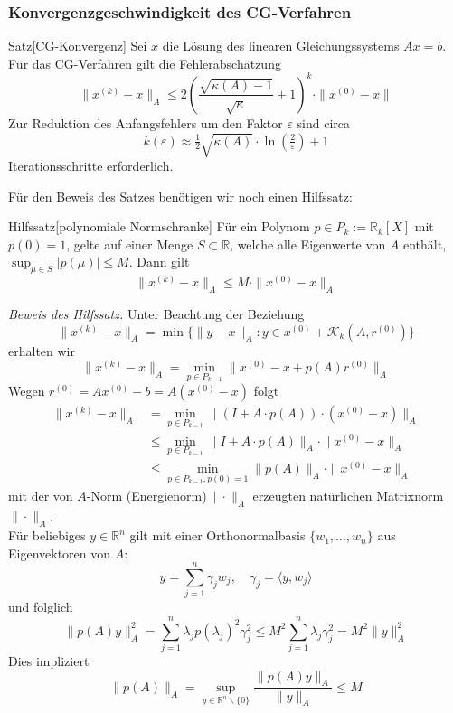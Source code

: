 \documentclass{article}
\begin{document}
    \subsubsection{Konvergenzgeschwindigkeit des CG-Verfahren}
    \begin{thmbox}{Satz}[CG-Konvergenz]
        Sei $x$ die Lösung des linearen Gleichungssystems $Ax=b$. Für das CG-Verfahren gilt die Fehlerabschätzung
        \[\|x^{(k)} - x\|_A \leq 2\left(\dfrac{\sqrt{\kappa(A)-1}}{\sqrt{\kappa}}+1\right)^k \cdot \|x^{(0)}-x\|\]
        Zur Reduktion des Anfangsfehlers um den Faktor $\varepsilon$ sind circa 
        \[k(\varepsilon)\approx \tfrac{1}{2}\sqrt{\kappa(A)}\cdot \ln(\tfrac{2}{\varepsilon}) +1 \]
        Iterationsschritte erforderlich. 
    \end{thmbox}
    Für den Beweis des Satzes benötigen wir noch einen Hilfssatz:
    \begin{thmbox}{Hilfssatz}[polynomiale Normschranke]
        Für ein Polynom $p\in P_k:=\mathbb{R}_k[X]$ mit $p(0)=1$, gelte auf einer Menge $S\subset \mathbb{R}$, welche
        alle Eigenwerte von $A$ enthält, $\sup_{\mu\in S} |p(\mu)| \leq M$. Dann gilt 
        \[\|x^{(k)} - x\|_A \leq M\cdot\|x^{(0)}-x\|_A\]
    \end{thmbox}
    \textit{Beweis des Hilfssatz.} Unter Beachtung der Beziehung 
    \[\|x^{(k)}-x\|_A = \min\{\|y-x\|_A : y\in x^{(0)}+\mathcal{K}_k(A,r^{(0)})\}\]
    erhalten wir 
    \[\|x^{(k)}-x\|_A = \min_{p\in P_{k-1}}\|x^{(0)}-x+p(A)r^{(0)}\|_A\]
    Wegen $r^{(0)} = Ax^{(0)}-b = A(x^{(0)}-x)$ folgt
    \begin{align*}
        \|x^{(k)}-x\|_A &= \min_{p\in P_{k-1}} \|(I+A\cdot p(A))\cdot (x^{(0)}-x)\|_A \\
        &\leq \min_{p\in P_{k-1}} \|I+A\cdot p(A)\|_A\cdot\|x^{(0)}-x\|_A \\
        &\leq \min_{p\in P_{k-1}, p(0)=1} \|p(A)\|_A\cdot\|x^{(0)}-x\|_A 
    \end{align*}
    mit der von $A$-Norm (Energienorm)$\|\cdot\|_A$ erzeugten natürlichen Matrixnorm $\|\cdot\|_A$. \\
    Für beliebiges $y\in\mathbb{R}^n$ gilt mit einer Orthonormalbasis $\{w_1,\dotsc,w_n\}$ aus Eigenvektoren von $A$:
    \[y=\sum_{j=1}^{n}\gamma_j w_j,\quad \gamma_j = \langle y, w_j\rangle\]
    und folglich 
    \[\|p(A)y\|_A^2 = \sum_{j=1}^{n} \lambda_j p(\lambda_j)^2\gamma_j^2 
    \leq M^2 \sum_{j=1}^{n} \lambda_j \gamma_j^2 = M^2 \|y\|_A^2\]
    Dies impliziert 
    \[\|p(A)\|_A = \sup_{y\in\mathbb{R}^n\backslash\{0\}} \dfrac{\|p(A)y\|_A}{\|y\|_A}\leq M\]
\end{document}
